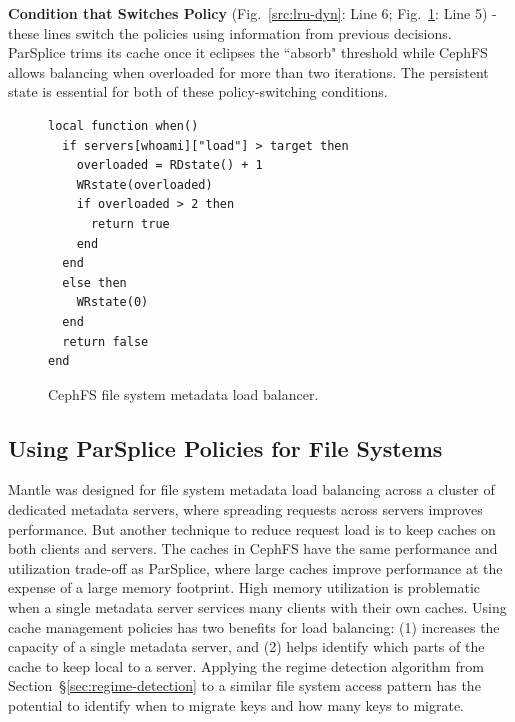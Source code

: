 \textbf{Condition that Switches Policy} (Fig.~\ref{src:lru-dyn}: Line 6;
Fig.~\ref{src:lua-cephfs}: Line 5) - these lines switch the policies using
information from previous decisions. ParSplice trims its cache once it eclipses
the ``absorb" threshold while CephFS allows balancing when overloaded for more
than two iterations. The persistent state is essential for both of these
policy-switching conditions.

\begin{figure}[t]
\footnotesize
\begin{verbatim}
local function when()
  if servers[whoami]["load"] > target then
    overloaded = RDstate() + 1
    WRstate(overloaded)
    if overloaded > 2 then
      return true
    end
  end
  else then
    WRstate(0)
  end
  return false
end
\end{verbatim}
\caption{CephFS file system metadata load balancer.\label{src:lua-cephfs}}
\end{figure}

\subsection{Using ParSplice Policies for File Systems}


Mantle was designed for file system metadata load balancing across a cluster of
dedicated metadata servers, where spreading requests across servers improves
performance. But another technique to reduce request load is to keep caches on
both clients and servers. The caches in CephFS have the same performance and
utilization trade-off as ParSplice, where large caches improve performance at
the expense of a large memory footprint. High memory utilization is problematic
when a single metadata server services many clients with their own caches.
Using cache management policies has two benefits for load balancing: (1)
increases the capacity of a single metadata server, and (2) helps identify
which parts of the cache to keep local to a server. Applying the regime
detection algorithm from Section~\S\ref{sec:regime-detection} to a similar file
system access pattern has the potential to identify when to migrate keys and
how many keys to migrate.


